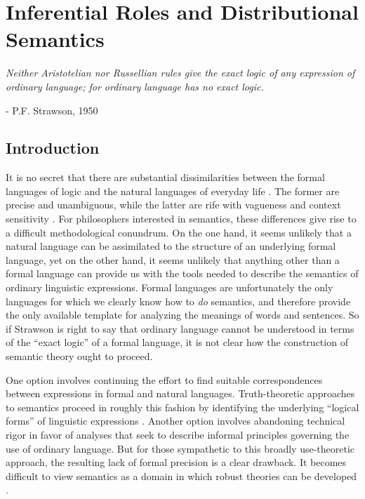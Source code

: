 
\chapter{Inferential Roles and Distributional Semantics}
\renewcommand{\epigraphrule}{0pt}
\setlength{\epigraphwidth}{4.5in}
\epigraph{\textit{Neither Aristotelian nor Russellian rules give the exact logic of any expression of ordinary language; for ordinary language has no exact logic.}}{- P.F. Strawson, 1950}

\section{Introduction}

It is no secret that there are substantial dissimilarities between the formal languages of logic and the natural languages of everyday life \citep{Stanley:2008,Recanati:2012}. The former are precise and unambiguous, while the latter are rife with vagueness and context sensitivity \citep{Recanati:2012}. For philosophers interested in semantics, these differences give rise to a difficult methodological conundrum. On the one hand, it seems unlikely that a natural language can be assimilated to the structure of an underlying formal language, yet on the other hand, it seems unlikely that anything other than a formal language can provide us with the tools needed to describe the semantics of ordinary linguistic expressions. Formal languages are unfortunately the only languages for which we clearly know how to \textit{do} semantics, and therefore provide the only available template for analyzing the meanings of words and sentences. So if Strawson is right to say that ordinary language cannot be understood in terms of the ``exact logic'' of a formal language, it is not clear how the construction of semantic theory ought to proceed. 

One option involves continuing the effort to find suitable correspondences between expressions in formal and natural languages. Truth-theoretic approaches to semantics proceed in roughly this fashion by identifying the underlying ``logical forms'' of linguistic expressions \citep{Soames:2010,Stanley:2008,Speaks:2014,Carpenter:1997}. Another option involves abandoning technical rigor in favor of analyses that seek to describe informal principles governing the use of ordinary language. But for those sympathetic to this broadly use-theoretic approach, the resulting lack of formal precision is a clear drawback. It becomes difficult to view semantics as a domain in which robust theories can be developed \citep[see][]{Wittgenstein:1953}. 


